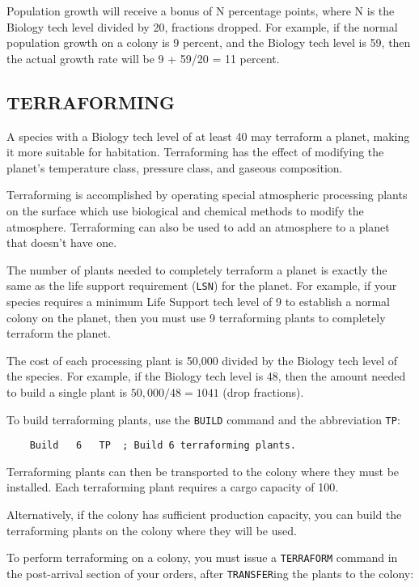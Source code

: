 \documentclass[10pt,titlepage]{article}
\begin{document}
Population growth will receive a bonus of N percentage points, where N is the
Biology tech level divided by 20, fractions dropped.  For example, if the
normal population growth on a colony is 9 percent, and the Biology tech level
is 59, then the actual growth rate will be 9 + 59/20 = 11 percent.


\subsection{TERRAFORMING}

A species with a Biology tech level of at least 40 may terraform a planet,
making it more suitable for habitation.  Terraforming has the effect of
modifying the planet's temperature class, pressure class, and gaseous
composition.

Terraforming is accomplished by operating special atmospheric processing
plants on the surface which use biological and chemical methods to modify
the atmosphere.  Terraforming can also be used to add an atmosphere to a planet
that doesn't have one.

The number of plants needed to completely terraform a planet is exactly the
same as the life support requirement (\texttt{LSN}) for the planet.  For example, if
your species requires a minimum Life Support tech level of 9 to establish
a normal colony on the planet, then you must use 9 terraforming plants to
completely terraform the planet.

The cost of each processing plant is 50,000 divided by the Biology tech level
of the species.  For example, if the Biology tech level is 48, then the amount
needed to build a single plant is $50,000/48 = 1041$ (drop fractions).

To build terraforming plants, use the \texttt{BUILD} command and the abbreviation \texttt{TP}:

\begin{verbatim}
	Build	6	TP	; Build 6 terraforming plants.\end{verbatim} 

Terraforming plants can then be transported to the colony where they must be
installed.  Each terraforming plant requires a cargo capacity of 100.

Alternatively, if the colony has sufficient production capacity, you can build
the terraforming plants on the colony where they will be used.

To perform terraforming on a colony, you must issue a \texttt{TERRAFORM} command in
the post-arrival section of your orders, after \texttt{TRANSFER}ing the plants to the
colony:
\end{document}

